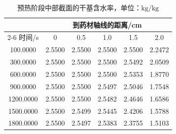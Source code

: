 \begin{table}[!htbp]\centering\small
\caption{预热阶段中部截面的干基含水率，单位：$\mathrm{kg/kg}$}\label{tab:q1-moisture}
\renewcommand{\arraystretch}{1.15}
\begin{tabular*}{0.96\textwidth}{@{\extracolsep{\fill}}cccccc}
\toprule
 & \multicolumn{5}{c}{到药材轴线的距离/cm}\\
\cmidrule(lr){2-6}
时间/s & 0 & 0.5 & 1.0 & 1.5 & 2.0\\\midrule
100.0000 & 2.5500 & 2.5500 & 2.5500 & 2.5500 & 2.2472\\
300.0000 & 2.5500 & 2.5500 & 2.5500 & 2.5492 & 2.0509\\
600.0000 & 2.5500 & 2.5500 & 2.5500 & 2.5353 & 1.8770\\
900.0000 & 2.5500 & 2.5500 & 2.5497 & 2.5046 & 1.7548\\
1200.0000 & 2.5500 & 2.5500 & 2.5482 & 2.4646 & 1.6586\\
1500.0000 & 2.5500 & 2.5499 & 2.5445 & 2.4206 & 1.5788\\
1800.0000 & 2.5500 & 2.5497 & 2.5383 & 2.3755 & 1.5103\\
\bottomrule
\end{tabular*}
\end{table}
